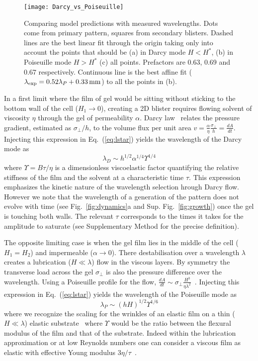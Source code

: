 \documentclass[twocolumn,superscriptaddress,showpacs,preprintnumbers,
amsmath,amssymb,prl]{revtex4-1}
\begin{document}
\begin{figure*}
	\texttt{[image: Darcy\_vs\_Poiseuille]}
	\caption{Comparing model predictions with measured wavelengths. Dots come from primary pattern, squares from secondary blisters. Dashed lines are the best linear fit through the origin taking only into account the points that should be (a) in Darcy mode $H<H^*$, (b) in Poiseuille mode $H>H^*$ (c) all points. Prefactors are 0.63, 0.69 and 0.67 respectively. Continuous line is the best affine fit ($\lambda_{\rm exp}=0.52\lambda_{P}+\SI{0.33}{\milli\metre}$) to all the points in (b).}
	\label{fig:DarcyPoiseuille}
\end{figure*}

In a first limit where the film of gel would be sitting without sticking to the bottom wall of the cell ($H_1\rightarrow0$), creating a 2D blister requires flowing solvent of viscosity $\eta$ through the gel of permeability $\alpha$. Darcy law~\cite{Darcy1856} relates the pressure gradient, estimated as $\sigma_\perp/h$, to the volume flux per unit area $v = \frac{\alpha}{\eta}\frac{\sigma_\perp}{h} = \frac{dA}{dt}$. Injecting this expression in Eq.~(\ref{eq:lstar}) yields the wavelength of the Darcy mode as
\begin{equation}
\lambda_D \sim h^{1/2} \alpha^{1/4} \Upsilon^{1/4}
\end{equation}
where $\Upsilon = B\tau/\eta$ is a dimensionless viscoelastic factor quantifying the relative stiffness of the film and the solvent at a characteristic time $\tau$. This expression emphasizes the kinetic nature of the wavelength selection hrough Darcy flow. However we note that the wavelength of a generation of the pattern does not evolve with time (see Fig.~\ref{fig:dynamics}a and Sup. Fig.~\ref{fig:growth}) once the gel is touching both walls. The relevant $\tau$ corresponds to the times it takes for the amplitude to saturate (see Supplementary Method for the precise definition).

The opposite limiting case is when the gel film lies in the middle of the cell ($H_1=H_2$) and impermeable ($\alpha\rightarrow 0$). There destabilisation over a wavelength $\lambda$ creates a lubrication ($H\ll\lambda$) flow in the viscous layers. By symmetry the transverse load across the gel $\sigma_\perp$ is also the pressure difference over the wavelength. Using a Poiseuille profile for the flow, $\frac{dA}{dt} \sim \sigma_\perp \frac{H^3}{\eta\lambda^2}$~\cite{Poiseuille1842}. Injecting this expression in Eq.~(\ref{eq:lstar}) yields the wavelength of the Poiseuille mode as
\begin{equation}
\lambda_P \sim (hH)^{1/2} \Upsilon^{1/6}
\end{equation}
where we recognize the scaling for the wrinkles of an elastic film on a thin ($H\ll\lambda$) elastic substrate~\cite{Cerda2003} where $\Upsilon$ would be the ratio between the flexural modulus of the film and that of the substrate. Indeed within the lubrication approximation or at low Reynolds numbers one can consider a viscous film as elastic with effective Young modulus $3\eta/\tau$~\cite{Biot1957,Boudaoud2001}.
\end{document}

